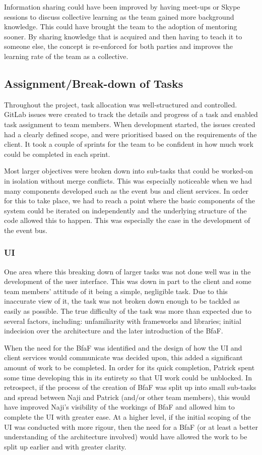 \documentclass{l3proj}
\begin{document}
Information sharing could have been improved by having meet-ups or Skype sessions to discuss collective learning as the team gained more background knowledge. This could have brought the team to the adoption of mentoring sooner. By sharing knowledge that is acquired and then having to teach it to someone else, the concept is re-enforced for both parties and improves the learning rate of the team as a collective.

\subsection{Assignment/Break-down of Tasks}
Throughout the project, task allocation was well-structured and controlled. GitLab issues were created to track the details and progress of a task and enabled task assignment to team members. When development started, the issues created had a clearly defined scope, and were prioritised based on the requirements of the client. It took a couple of sprints for the team to be confident in how much work could be completed in each sprint.

Most larger objectives were broken down into sub-tasks that could be worked-on in isolation without merge conflicts. This was especially noticeable when we had many components developed such as the event bus and client services. In order for this to take place, we had to reach a point where the basic components of the system could be iterated on independently and the underlying structure of the code allowed this to happen. This was especially the case in the development of the event bus.

\subsubsection{UI}
One area where this breaking down of larger tasks was not done well was in the development of the user interface. This was down in part to the client and some team members' attitude of it being a simple, negligible task. Due to this inaccurate view of it, the task was not broken down enough to be tackled as easily as possible. The true difficulty of the task was more than expected due to several factors, including: unfamiliarity with frameworks and libraries; initial indecision over the architecture and the later introduction of the BfaF.

When the need for the BfaF was identified and the design of how the UI and client services would communicate was decided upon, this added a significant amount of work to be completed. In order for its quick completion, Patrick spent some time developing this in its entirety so that UI work could be unblocked. In retrospect, if the process of the creation of BfaF was split up into small sub-tasks and spread between Naji and Patrick (and/or other team members), this would have improved Naji's visibility of the workings of BfaF and allowed him to complete the UI with greater ease. At a higher level, if the initial scoping of the UI was conducted with more rigour, then the need for a BfaF (or at least a better understanding of the architecture involved) would have allowed the work to be split up earlier and with greater clarity.
\end{document}
